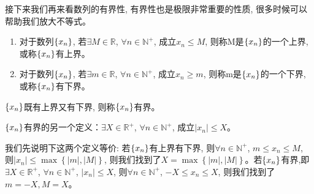 接下来我们再来看数列的有界性, 有界性也是极限非常重要的性质, 很多时候可以帮助我们放大不等式。

\begin{definition}\label{definition:limit-bound}
    \begin{enumerate}
        \item 对于数列$\left\{ x_n\right\}$, 若$\exists M \in \mathbb{R}$, $\forall n \in \mathbb{N}^+$, 成立$x_n \le M$, 则称M是$\left\{ x_n\right\}$的一个上界, 或称$\left\{ x_n\right\}$有上界。
        \item 对于数列$\left\{ x_n\right\}$, 若$\exists m \in \mathbb{R}$, $\forall n \in \mathbb{N}^+$, 成立$x_n \ge m$, 则称m是$\left\{ x_n\right\}$的一个下界, 或称$\left\{ x_n\right\}$有下界。
    \end{enumerate}
    $\left\{ x_n\right\}$既有上界又有下界, 则称$\left\{ x_n\right\}$有界。

    $\left\{ x_n\right\}$有界的另一个定义：$\exists X \in \mathbb{R}^+$, $\forall n \in \mathbb{N}^+$, 成立$\left| x_n \right| \le X$。
\end{definition}
\begin{remark}
    我们先说明下这两个定义等价: 若$\left\{ x_n\right\}$有上界有下界, 则$\forall n \in \mathbb{N}^+$, $m \le x_n \le M$, 则$\left| x_n \right| \le \max\left\{ |m|, |M|\right\}$, 则我们找到了$X = \max\left\{ |m|, |M|\right\}$。若$\left\{ x_n\right\}$有界,即$\exists X \in \mathbb{R}^+$, $\forall n \in \mathbb{N}^+$, $\left| x_n \right| \le X$, 则$\forall n \in \mathbb{N}^+$, $-X \le x_n \le X$, 则我们找到了$m = -X, M = X$。
\end{remark}


